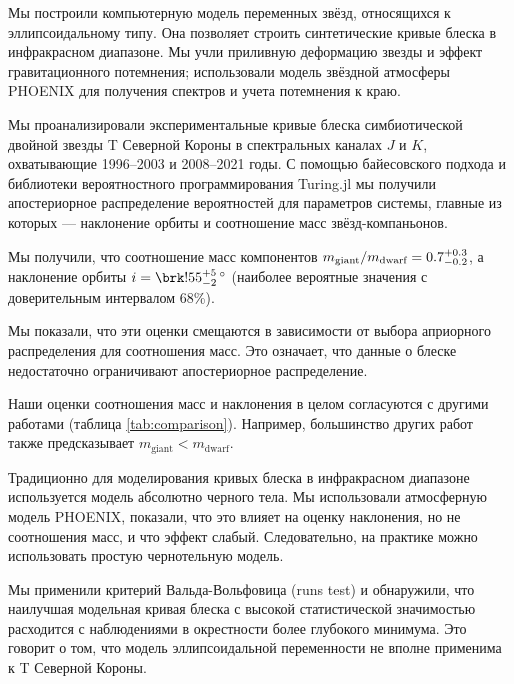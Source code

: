 




Мы построили компьютерную модель переменных звёзд, относящихся к эллипсоидальному типу. Она позволяет строить синтетические кривые блеска в инфракрасном диапазоне. Мы учли приливную деформацию звезды и эффект гравитационного потемнения; использовали модель звёздной атмосферы PHOENIX для получения спектров и учета потемнения к краю.

Мы проанализировали экспериментальные кривые блеска симбиотической двойной звезды T Северной Короны в спектральных каналах $J$ и $K$, охватывающие 1996--2003 и 2008--2021 годы. С помощью байесовского подхода и библиотеки вероятностного программирования Turing.jl мы получили апостериорное распределение вероятностей для параметров системы, главные из которых --- наклонение орбиты и соотношение масс звёзд-компаньонов.

Мы получили, что соотношение масс компонентов $m_\text{giant} / m_\text{dwarf} = 0.7^{+0.3}_{-0.2}$, а наклонение орбиты $i = \resulti$ (наиболее вероятные значения с доверительным интервалом 68\%).

Мы показали, что эти оценки смещаются в зависимости от выбора априорного распределения для соотношения масс. Это означает, что данные о блеске недостаточно ограничивают апостериорное распределение.

Наши оценки соотношения масс и наклонения в целом согласуются с другими работами (таблица \ref{tab:comparison}). Например, большинство других работ также предсказывает $m_\text{giant} < m_\text{dwarf}$.

Традиционно для моделирования кривых блеска в инфракрасном диапазоне используется модель абсолютно черного тела. Мы использовали атмосферную модель PHOENIX, показали, что это влияет на оценку наклонения, но не соотношения масс, и что эффект слабый. Следовательно, на практике можно использовать простую чернотельную модель.

Мы применили критерий Вальда-Вольфовица (runs test) и обнаружили, что наилучшая модельная кривая блеска с высокой статистической значимостью расходится с наблюдениями в окрестности более глубокого минимума. Это говорит о том, что модель эллипсоидальной переменности не вполне применима к T Северной Короны.


\showbib


